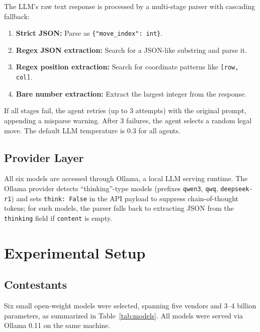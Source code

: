 \documentclass[11pt]{article}
\begin{document}
The LLM's raw text response is processed by a multi-stage parser with cascading fallback:
\begin{enumerate}[nosep,label=(\roman*)]
\item \textbf{Strict JSON:} Parse as \texttt{\{"move\_index": int\}}.
\item \textbf{Regex JSON extraction:} Search for a JSON-like substring and parse it.
\item \textbf{Regex position extraction:} Search for coordinate patterns like \texttt{[row, col]}.
\item \textbf{Bare number extraction:} Extract the largest integer from the response.
\end{enumerate}

If all stages fail, the agent retries (up to 3 attempts) with the original prompt, appending a misparse warning. After 3 failures, the agent selects a random legal move. The default LLM temperature is 0.3 for all agents.

\subsection{Provider Layer}

All six models are accessed through Ollama, a local LLM serving runtime. The Ollama provider detects ``thinking''-type models (prefixes \texttt{qwen3}, \texttt{qwq}, \texttt{deepseek-r1}) and sets \texttt{think: False} in the API payload to suppress chain-of-thought tokens; for such models, the parser falls back to extracting JSON from the \texttt{thinking} field if \texttt{content} is empty.

\section{Experimental Setup}

\subsection{Contestants}

Six small open-weight models were selected, spanning five vendors and 3--4 billion parameters, as summarized in Table~\ref{tab:models}. All models were served via Ollama 0.11 on the same machine.
\end{document}
